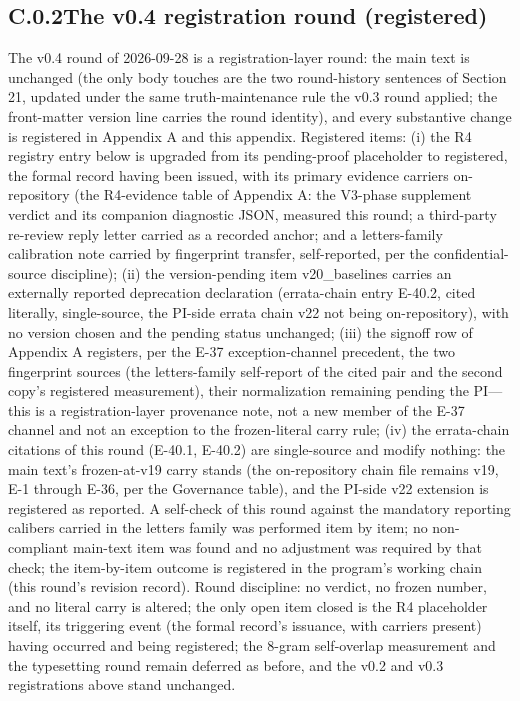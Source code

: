 \documentclass[11pt]{article}
\begin{document}
\subsection*{C.0.2\quad The v0.4 registration round (registered)}
\noindent The v0.4 round of 2026-09-28 is a registration-layer round: the main text is unchanged (the only body touches are the two round-history sentences of Section 21, updated under the same truth-maintenance rule the v0.3 round applied; the front-matter version line carries the round identity), and every substantive change is registered in Appendix A and this appendix. Registered items: (i) the R4 registry entry below is upgraded from its pending-proof placeholder to registered, the formal record having been issued, with its primary evidence carriers on-repository (the R4-evidence table of Appendix A: the V3-phase supplement verdict and its companion diagnostic JSON, measured this round; a third-party re-review reply letter carried as a recorded anchor; and a letters-family calibration note carried by fingerprint transfer, self-reported, per the confidential-source discipline); (ii) the version-pending item v20\_baselines carries an externally reported deprecation declaration (errata-chain entry E-40.2, cited literally, single-source, the PI-side errata chain v22 not being on-repository), with no version chosen and the pending status unchanged; (iii) the signoff row of Appendix A registers, per the E-37 exception-channel precedent, the two fingerprint sources (the letters-family self-report of the cited pair and the second copy's registered measurement), their normalization remaining pending the PI—this is a registration-layer provenance note, not a new member of the E-37 channel and not an exception to the frozen-literal carry rule; (iv) the errata-chain citations of this round (E-40.1, E-40.2) are single-source and modify nothing: the main text's frozen-at-v19 carry stands (the on-repository chain file remains v19, E-1 through E-36, per the Governance table), and the PI-side v22 extension is registered as reported. A self-check of this round against the mandatory reporting calibers carried in the letters family was performed item by item; no non-compliant main-text item was found and no adjustment was required by that check; the item-by-item outcome is registered in the program's working chain (this round's revision record). Round discipline: no verdict, no frozen number, and no literal carry is altered; the only open item closed is the R4 placeholder itself, its triggering event (the formal record's issuance, with carriers present) having occurred and being registered; the 8-gram self-overlap measurement and the typesetting round remain deferred as before, and the v0.2 and v0.3 registrations above stand unchanged.\par
\end{document}

